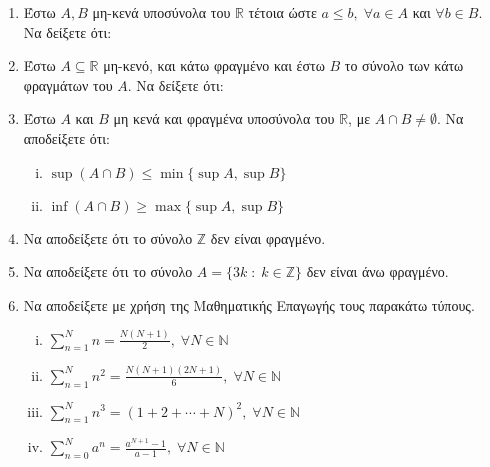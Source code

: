 \documentclass[a4paper,table]{report}
\begin{document}
\begin{enumerate}
    \item Έστω $ A, B $ μη-κενά υποσύνολα του $ \mathbb{R} $ τέτοια ώστε 
      $ a \leq b, \; \forall a \in A $ και $ \forall b \in B $.
      Να δείξετε ότι:

    \item Έστω $ A \subseteq \mathbb{R} $ μη-κενό, και κάτω φραγμένο και έστω 
      $ B $ το σύνολο των κάτω φραγμάτων του $A$. Να δείξετε ότι:

    \item Έστω $A$ και $B$ μη κενά και φραγμένα υποσύνολα του $ \mathbb{R} $, με 
      $ A \cap B \neq \emptyset $. Να αποδείξετε ότι:
      \begin{enumerate}[i)]
        \item $ \sup {(A \cap B)} \leq \min \{ \sup A, \sup B \} $
        \item $ \inf {(A \cap B)} \geq \max \{ \sup A, \sup B \} $
      \end{enumerate}

    \item Να αποδείξετε ότι το σύνολο $ \mathbb{Z} $ δεν είναι φραγμένο.

    \item \label{ask:3z} Να αποδείξετε ότι το σύνολο 
      $ A = \{ 3k \; : \; k \in \mathbb{Z} \} $ δεν είναι άνω φραγμένο.

    \item Να αποδείξετε με χρήση της Μαθηματικής Επαγωγής τους παρακάτω τύπους.
      \label{eq:epagsums}
      \begin{enumerate}[i)]
        \item $ \sum_{n=1}^{N} n = \frac{N(N+1)}{2},\; \forall N \in
          \mathbb{N} $
        \item $ \sum_{n=1}^{N} n^{2} = \frac{N(N+1)(2N+1)}{6},\; \forall 
          N \in \mathbb{N} $
        \item $ \sum_{n=1}^{N} n^{3} = (1+2+\cdots + N)^{2}, \; 
          \forall N \in \mathbb{N} $
        \item $ \sum_{n=0}^{N} a^{n} = \frac{a^{N+1} - 1}{a-1},\; 
          \forall N \in \mathbb{N}$
      \end{enumerate}


\end{enumerate}
\end{document}
